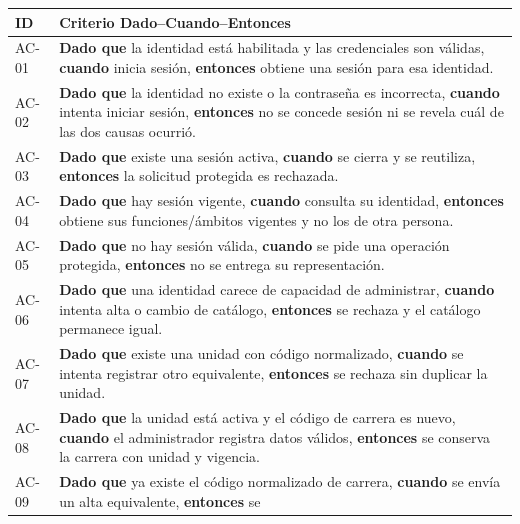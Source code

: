 \documentclass[12pt,a4paper]{report}
\begin{document}
{\def\LTcaptype{none} %
\begin{longtable}[]{@{}
  >{\raggedright\arraybackslash}p{}
  >{\raggedright\arraybackslash}p{}@{}}
\toprule\noalign{}
\begin{minipage}[b]{\linewidth}\raggedright
ID
\end{minipage} & \begin{minipage}[b]{\linewidth}\raggedright
Criterio Dado--Cuando--Entonces
\end{minipage} \\
\midrule\noalign{}
\endhead
\bottomrule\noalign{}
\endlastfoot
AC-01 & \textbf{Dado que} la identidad está habilitada y las
credenciales son válidas, \textbf{cuando} inicia sesión,
\textbf{entonces} obtiene una sesión para esa identidad. \\
AC-02 & \textbf{Dado que} la identidad no existe o la contraseña es
incorrecta, \textbf{cuando} intenta iniciar sesión, \textbf{entonces} no
se concede sesión ni se revela cuál de las dos causas ocurrió. \\
AC-03 & \textbf{Dado que} existe una sesión activa, \textbf{cuando}
se cierra y se reutiliza, \textbf{entonces} la solicitud protegida es
rechazada. \\
AC-04 & \textbf{Dado que} hay sesión vigente, \textbf{cuando}
consulta su identidad, \textbf{entonces} obtiene sus funciones/ámbitos
vigentes y no los de otra persona. \\
AC-05 & \textbf{Dado que} no hay sesión válida, \textbf{cuando} se
pide una operación protegida, \textbf{entonces} no se entrega su
representación. \\
AC-06 & \textbf{Dado que} una identidad carece de capacidad de
administrar, \textbf{cuando} intenta alta o cambio de catálogo,
\textbf{entonces} se rechaza y el catálogo permanece igual. \\
AC-07 & \textbf{Dado que} existe una unidad con código normalizado,
\textbf{cuando} se intenta registrar otro equivalente, \textbf{entonces}
se rechaza sin duplicar la unidad. \\
AC-08 & \textbf{Dado que} la unidad está activa y el código de
carrera es nuevo, \textbf{cuando} el administrador registra datos
válidos, \textbf{entonces} se conserva la carrera con unidad y
vigencia. \\
AC-09 & \textbf{Dado que} ya existe el código normalizado de carrera,
\textbf{cuando} se envía un alta equivalente, \textbf{entonces} se

\end{longtable}}
\end{document}
